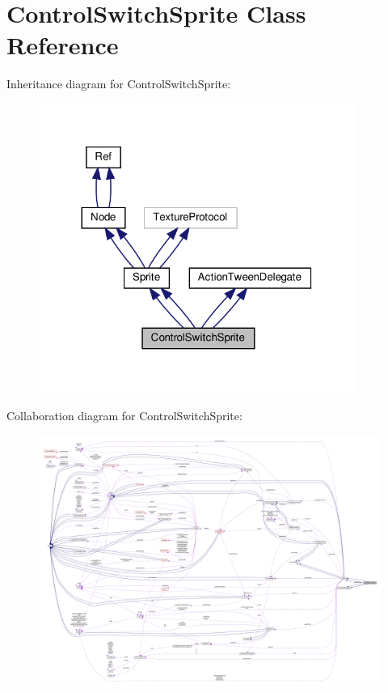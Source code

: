 \hypertarget{classControlSwitchSprite}{}\section{Control\+Switch\+Sprite Class Reference}
\label{classControlSwitchSprite}


Inheritance diagram for Control\+Switch\+Sprite\+:
\nopagebreak
\begin{figure}[H]
\begin{center}
\leavevmode
\includegraphics[width=293pt]{classControlSwitchSprite__inherit__graph}
\end{center}
\end{figure}


Collaboration diagram for Control\+Switch\+Sprite\+:
\nopagebreak
\begin{figure}[H]
\begin{center}
\leavevmode
\includegraphics[width=350pt]{classControlSwitchSprite__coll__graph}
\end{center}
\end{figure}
